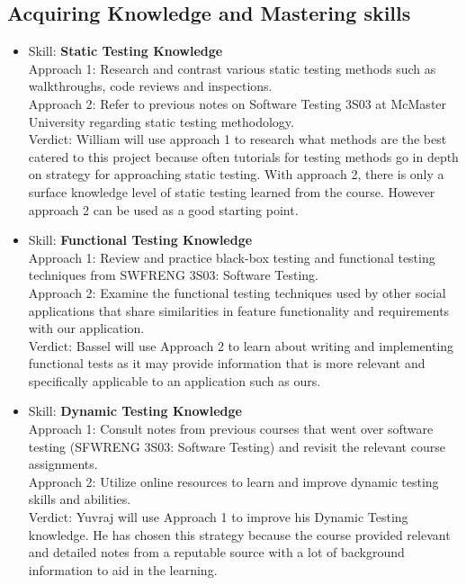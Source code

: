 \documentclass[12pt, titlepage]{article}
\begin{document}
\begin{enumerate}
		\subsection{Acquiring Knowledge and Mastering skills}
		\begin{itemize}
			\item Skill: \textbf{Static Testing Knowledge}
			\\ Approach 1: Research and contrast various static testing methods such as walkthroughs, code reviews and inspections.
			\\ Approach 2: Refer to previous notes on Software Testing 3S03 at McMaster University regarding static testing methodology.
			\\ Verdict: William will use approach 1 to research what methods are the best catered to this project because often tutorials for testing methods go in depth on strategy for approaching static testing. With approach 2, there is only a surface knowledge level of static testing learned from the course. However approach 2 can be used as a good starting point.
			
			\item Skill: \textbf{Functional Testing Knowledge}
			\\Approach 1: Review and practice black-box testing and functional testing techniques from SWFRENG 3S03: Software Testing.
			\\Approach 2: Examine the functional testing techniques used by other social applications that share similarities in feature functionality and requirements with our application.
			\\Verdict: Bassel will use Approach 2 to learn about writing and implementing functional tests as it may provide information that is more relevant and specifically applicable to an application such as ours.
			
			\item Skill: \textbf{Dynamic Testing Knowledge}
			\\Approach 1: Consult notes from previous courses that went over software testing (SFWRENG 3S03: Software Testing) and revisit the relevant course assignments.
			\\ Approach 2: Utilize online resources to learn and improve dynamic testing skills and abilities.
			\\ Verdict: Yuvraj will use Approach 1 to improve his Dynamic Testing knowledge. He has chosen this strategy because the course provided relevant and detailed notes from a reputable source with a lot of background information to aid in the learning.
			

\end{itemize}
\end{enumerate}
\end{document}
